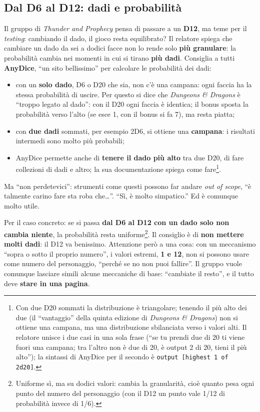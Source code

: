 \subsection{Dal D6 al D12: dadi e probabilità}
\label{z7:subsec:dadi}

Il gruppo di \emph{Thunder and Prophecy} pensa di passare a un \textbf{D12}, ma
teme per il \emph{testing}: cambiando il dado, il gioco resta equilibrato? Il
relatore spiega che cambiare un dado da sei a dodici facce non lo rende solo
\textbf{più granulare}: la probabilità cambia nei momenti in cui si tirano
\textbf{più dadi}. Consiglia a tutti \textbf{AnyDice}, ``un sito bellissimo'' per
calcolare le probabilità dei dadi:
\begin{itemize}
  \item con un \textbf{solo dado}, D6 o D20 che sia, non c'è una campana: ogni
        faccia ha la stessa probabilità di uscire. Per questo si dice che
        \emph{Dungeons \& Dragons} è ``troppo legato al dado'': con il D20 ogni
        faccia è identica; il bonus sposta la probabilità verso l'alto (se esce
        1, con il bonus si fa 7), ma resta piatta;
  \item con \textbf{due dadi} sommati, per esempio 2D6, si ottiene una
        \textbf{campana}: i risultati intermedi sono molto più probabili;
  \item AnyDice permette anche di \textbf{tenere il dado più alto} tra due D20, di
        fare collezioni di dadi e altro; la sua documentazione spiega come
        fare\footnote{Con due D20 sommati la distribuzione è triangolare; tenendo
        il più alto dei due (il ``vantaggio'' della quinta edizione di
        \emph{Dungeons \& Dragons}) non si ottiene una campana, ma una
        distribuzione sbilanciata verso i valori alti. Il relatore unisce i due
        casi in una sola frase (``se tu prendi due di 20 ti viene fuori una
        campana; tra l'altro non è due di 20, è output 2 di 20, tieni il più
        alto''); la sintassi di AnyDice per il secondo è
        \texttt{output [highest 1 of 2d20]}.}.
\end{itemize}
Ma ``non perdetevici'': strumenti come questi possono far andare \emph{out of
scope}, ``è talmente carino fare sta roba che\dots''. ``Sì, è molto simpatico.''
Ed è comunque molto utile.

Per il caso concreto: se si passa \textbf{dal D6 al D12 con un dado solo non cambia
niente}, la probabilità resta uniforme\footnote{Uniforme sì, ma su dodici
valori: cambia la granularità, cioè quanto pesa ogni punto del numero del
personaggio (con il D12 un punto vale 1/12 di probabilità invece di 1/6).}. Il
consiglio è di \textbf{non mettere molti dadi}: il D12 va benissimo. Attenzione
però a una cosa: con un meccanismo ``sopra o sotto il proprio numero'', i valori
estremi, \textbf{1 e 12}, non si possono usare come numero del personaggio,
``perché se no non puoi fallire''. Il gruppo vuole comunque lasciare simili alcune
meccaniche di base: ``cambiate il resto'', e il tutto deve \textbf{stare in una
pagina}.

